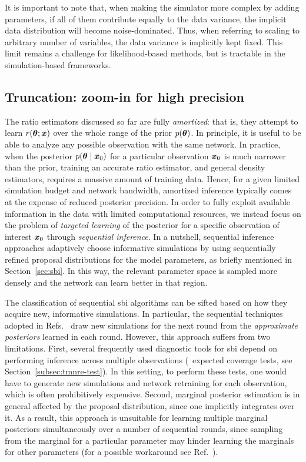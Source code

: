 It is important to note that, when making the simulator more complex by adding parameters, if all of them contribute equally to the data variance, the implicit data distribution will become noise-dominated. Thus, when referring to scaling to arbitrary number of variables, the data variance is implicitly kept fixed. This limit remains a challenge for likelihood-based methods, but is tractable in the simulation-based frameworks.


\subsection{Truncation: zoom-in for high precision} \label{subsec:tmnre-t}

 The ratio estimators discussed so far are fully \emph{amortized}: that is, they attempt to learn $r(\bm{\theta}; \bm{x})$ over the whole range of the prior $p(\bm{\theta})$. In principle, it is useful to be able to analyze any possible observation with the same network. In practice, when the posterior $p(\bm{\theta} \mid \bm{x}_0)$ for a particular observation $\bm{x}_0$ is much narrower than the prior, training an accurate ratio estimator, and general density estimators, requires a massive amount of training data. Hence, for a given limited simulation budget and network bandwidth, amortized inference typically comes at the expense of reduced posterior precision. In order to fully exploit available information in the data with limited computational resources, we instead focus on the problem of \emph{targeted learning} of the posterior for a specific observation of interest $\bm{x}_0$ through \emph{sequential inference}. In a nutshell, sequential inference approaches adaptively choose informative simulations by using sequentially refined proposal distributions for the model parameters, as briefly mentioned in Section~\ref{sec:sbi}. In this way, the relevant parameter space is sampled more densely and the network can learn better in that region.

The classification of sequential \gls*{sbi} algorithms can be sifted based on how they acquire new, informative simulations. In particular, the sequential techniques adopted in Refs.~\cite{Papamakarios:2016ctj, Lueckmann:2017aa, Greenberg:2019aa, Papamakarios:2018aa, Hermans:2019ioj, Durkan:2020aa} draw new simulations for the next round from the \emph{approximate posteriors} learned in each round. However, this approach suffers from two limitations. First, several frequently used diagnostic tools for \gls*{sbi} depend on performing inference across multiple observations (\eg~expected coverage tests, see Section~\ref{subsec:tmnre-test}). In this setting, to perform these tests, one would have to generate new simulations and network retraining for each observation, which is often prohibitively expensive. Second, marginal posterior estimation is in general affected by the proposal distribution, since one implicitly integrates over it. As a result, this approach is unsuitable for learning multiple marginal posteriors simultaneously over a number of sequential rounds, since sampling from the marginal for a particular parameter may hinder learning the marginals for other parameters (for a possible workaround see Ref.~\cite{Alsing:2019xrx}).

